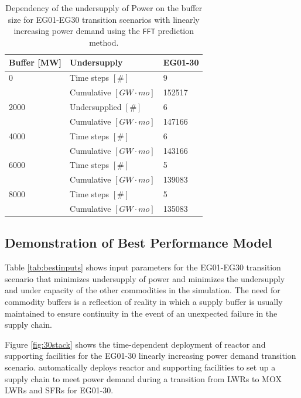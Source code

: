 \begin{table}[h]
	\centering
	\caption{Dependency of the undersupply of Power on the buffer size 
	for EG01-EG30 transition scenarios with linearly 
	increasing power demand using the \texttt{FFT} prediction method.}
	\label{tab:buff_size}
	\footnotesize
		\begin{tabular}{lll}
                \hline
                \textbf{Buffer [MW]}     & \textbf{Undersupply}               & \textbf{EG01-30} \\
		\hline
		0             & Time steps $[\#]$  & 9\\  
                      & Cumulative $[GW\cdot mo]$    & 152517 \\ \hline
        2000          & Undersupplied $[\#]$ & 6 \\  
        	      & Cumulative $[GW\cdot mo]$   & 147166 \\ \hline
        4000          & Time steps $[\#]$ & 6 \\  
				  & Cumulative $[GW\cdot mo]$     & 143166 \\ \hline
		6000          & Time steps $[\#]$  & 5 \\  
		& Cumulative $[GW\cdot mo]$     & 139083 \\ \hline
        8000          & Time steps $[\#]$  & 5  \\  
	              & Cumulative $[GW\cdot mo]$  & 135083 \\ \hline
	\end{tabular}
\end{table}

\subsection{Demonstration of Best Performance Model}
Table \ref{tab:bestinputs} 
shows \deploy input parameters for the 
EG01-EG30 transition scenario
that minimizes undersupply of power and minimizes 
the undersupply and under capacity of the other commodities
in the simulation. 
The need for commodity buffers is a reflection of reality
in which a supply buffer is usually maintained to ensure 
continuity in the event of an unexpected failure in the supply chain.

Figure \ref{fig:30stack} shows the
time-dependent deployment of reactor and supporting facilities 
for the EG01-30 linearly increasing power demand 
transition scenario.
\deploy automatically deploys reactor and supporting facilities 
to set up a supply chain to meet power demand
during a transition from \glspl{LWR} to \gls{MOX} \glspl{LWR} and 
\glspl{SFR} for EG01-30. 

